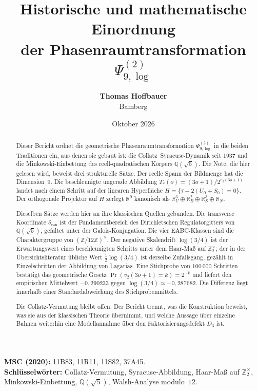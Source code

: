 \documentclass[11pt,a4paper]{article}
\title{\textbf{Historische und mathematische Einordnung\\
der Phasenraumtransformation $\Psi_{9,\log}^{(2)}$}}
\author{\textbf{Thomas Hoffbauer}\\ Bamberg}
\date{Oktober 2026}
\theoremstyle{plain}
\theoremstyle{definition}
\newcommand{\Z}{\mathbb{Z}}
\newcommand{\Q}{\mathbb{Q}}
\newcommand{\R}{\mathbb{R}}
\numberwithin{equation}{section}
\begin{document}
\maketitle

\begin{abstract}
\noindent
Dieser Bericht ordnet die geometrische Phasenraumtransformation
$\Psi_{9,\log}^{(2)}$ in die beiden Traditionen ein, aus denen sie gebaut ist:
die Collatz--Syracuse-Dynamik seit 1937 und die Minkowski-Einbettung des
reell-quadratischen Körpers $\Q(\sqrt{5})$.
Die Note, die hier gelesen wird, beweist drei strukturelle Sätze.
Der reelle Spann der Bildmenge hat die Dimension~$9$.
Die beschleunigte ungerade Abbildung
$T_*(o)=(3o+1)/2^{v_2(3o+1)}$ landet nach einem Schritt auf der
linearen Hyperfläche $H=\{\tau-2(U_0+S_0)=0\}$.
Der orthogonale Projektor auf $H$ zerlegt $\R^9$ kanonisch als
$\R^3_U\oplus\R^2_B\oplus\R^3_S\oplus\R_N$.

Dieselben Sätze werden hier an ihre klassischen Quellen gebunden.
Die transverse Koordinate $\delta_{\mathrm{can}}$ ist der Fundamentbereich des
Dirichletschen Regulatorgitters von $\Q(\sqrt{5})$, gefaltet unter der
Galois-Konjugation.
Die vier EABC-Klassen sind die Charaktergruppe von $(\Z/12\Z)^\times$.
Der negative Skalendrift $\log(3/4)$ ist der Erwartungswert eines
beschleunigten Schritts unter dem Haar-Maß auf $\Z_2^\times$;
der in der Übersichtsliteratur übliche Wert $\tfrac12\log(3/4)$ ist derselbe
Zufallsgang, gezählt in Einzelschritten der Abbildung von Lagarias.
Eine Stichprobe von $100\,000$ Schritten bestätigt das geometrische Gesetz
$\Pr(v_2(3o+1)=k)=2^{-k}$ und liefert den empirischen Mittelwert
$-0{,}290233$ gegen $\log(3/4)\approx -0{,}287682$.
Die Differenz liegt innerhalb einer Standardabweichung des Stichprobenmittels.

Die Collatz-Vermutung bleibt offen.
Der Bericht trennt, was die Konstruktion beweist, was sie aus der klassischen
Theorie übernimmt, und welche Aussage über einzelne Bahnen weiterhin eine
Modellannahme über den Faktorisierungsdefekt $D_3$ ist.
\end{abstract}

\noindent\textbf{MSC (2020):} 11B83, 11R11, 11S82, 37A45.\\
\textbf{Schlüsselwörter:} Collatz-Vermutung, Syracuse-Abbildung, Haar-Maß auf $\Z_2^\times$,
Minkowski-Einbettung, $\Q(\sqrt{5})$, Walsh-Analyse modulo~$12$.

\tableofcontents
\newpage

\end{document}
